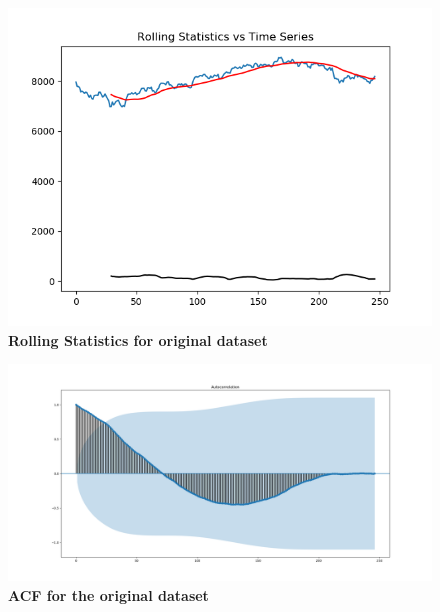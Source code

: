 \documentclass[BTech]{srmuthesis}
\begin{document}
\begin{figure}[H]
	\centering
	\includegraphics[width=\linewidth]{ARIMA_RSOri.png}
	\caption{\bf Rolling Statistics for original dataset}
	\label{fig:ARIMA_Original}
\end{figure} 

\begin{figure}[H]
	\centering
	\includegraphics[width=\linewidth]{ARIMA_ACFOri.png}
	\caption{\bf ACF for the original dataset}
	\label{fig:ARIMA_ACFOri}
\end{figure}
\end{document}

